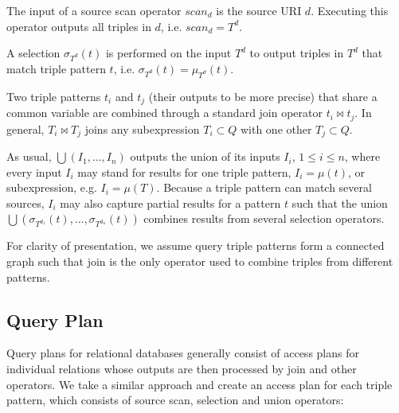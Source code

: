 \begin{definition} The input of a source scan operator $scan_d$ is the source URI $d$.
Executing this operator outputs all triples in $d$, i.e. $scan_d = T^d$.
\end{definition}

\begin{definition}[Selection]  A selection $\sigma_{T^d}(t)$ is performed on the input $T^d$ to output
triples in $T^d$ that match triple pattern $t$, i.e. $\sigma_{T^d}(t) = \mu_{T^d}(t)$. 
\end{definition}

Two triple patterns $t_i$ and $t_j$ (their outputs to be more precise) that share a common variable are combined through a standard join operator $t_i\Join t_j$. In general, $T_i\Join T_j$ joins any subexpression $T_i \subset Q$ with one other $T_j \subset Q$. 

\begin{definition}[Union] As usual, $\bigcup(I_1,\ldots,I_n)$
outputs the union of its inputs $I_i$, $1\leq i \leq n$, where every input $I_i$ may stand for results for one triple pattern, $I_i = \mu(t)$, or subexpression, e.g. $I_i = \mu(T)$. Because a triple pattern can match several sources, $I_i$ may also capture partial results for a pattern $t$ such that the union
$\bigcup(\sigma_{T^{d_1}}(t),\ldots,\sigma_{T^{d_n}}(t))$ combines results from several selection operators.   
\end{definition}

For clarity of presentation, we assume query triple patterns form a connected graph such that join is the only operator used to combine triples from different patterns. 


\subsection{Query Plan}
\label{sec:basicshape}
Query plans for relational databases generally consist of access plans
for individual relations whose outputs are then processed by join and
other operators. We take a similar approach and create an
access plan for each triple pattern, which consists of source scan, selection and union
operators:

